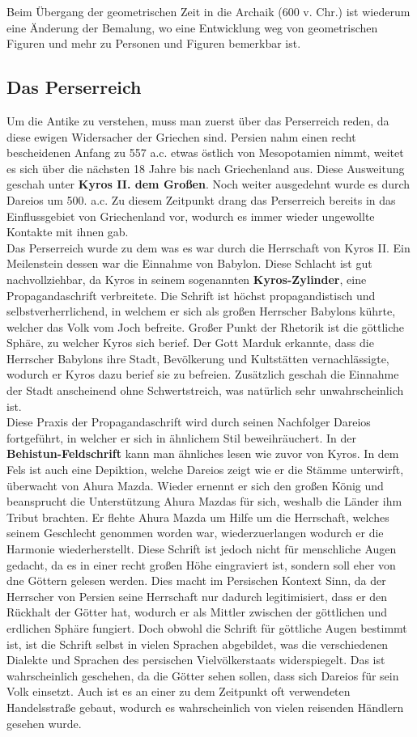 \documentclass{article}
\begin{document}
	Beim Übergang der geometrischen Zeit in die Archaik (600 v. Chr.) ist wiederum eine Änderung der Bemalung, wo eine Entwicklung weg von geometrischen Figuren und mehr zu Personen und Figuren bemerkbar ist.
	\subsection{Das Perserreich}
	Um die Antike zu verstehen, muss man zuerst über das Perserreich reden, da diese ewigen Widersacher der Griechen sind. Persien nahm einen recht bescheidenen Anfang zu 557 a.c. etwas östlich von Mesopotamien nimmt, weitet es sich über die nächsten 18 Jahre bis nach Griechenland aus. Diese Ausweitung geschah unter \textbf{Kyros II. dem Großen}. Noch weiter ausgedehnt wurde es durch Dareios um 500. a.c. Zu diesem Zeitpunkt drang das Perserreich bereits in das Einflussgebiet von Griechenland vor, wodurch es immer wieder ungewollte Kontakte mit ihnen gab. \\
	Das Perserreich wurde zu dem was es war durch die Herrschaft von Kyros II. Ein Meilenstein dessen war die Einnahme von Babylon. Diese Schlacht ist gut nachvollziehbar, da Kyros in seinem sogenannten \textbf{Kyros-Zylinder}, eine Propagandaschrift verbreitete. Die Schrift ist höchst propagandistisch und selbstverherrlichend, in welchem er sich als großen Herrscher Babylons kührte, welcher das Volk vom Joch befreite. Großer Punkt der Rhetorik ist die göttliche Sphäre, zu welcher Kyros sich berief. Der Gott Marduk erkannte, dass die Herrscher Babylons ihre Stadt, Bevölkerung und Kultstätten vernachlässigte, wodurch er Kyros dazu berief sie zu befreien. Zusätzlich geschah die Einnahme der Stadt anscheinend ohne Schwertstreich, was natürlich sehr unwahrscheinlich ist. \\
	Diese Praxis der Propagandaschrift wird durch seinen Nachfolger Dareios fortgeführt, in welcher er sich in ähnlichem Stil beweihräuchert. In der \textbf{Behistun-Feldschrift} kann man ähnliches lesen wie zuvor von Kyros. In dem Fels ist auch eine Depiktion, welche Dareios zeigt wie er die Stämme unterwirft, überwacht von Ahura Mazda. Wieder ernennt er sich den großen König und beansprucht die Unterstützung Ahura Mazdas für sich, weshalb die Länder ihm Tribut brachten. Er flehte Ahura Mazda um Hilfe um die Herrschaft, welches seinem Geschlecht genommen worden war, wiederzuerlangen wodurch er die Harmonie wiederherstellt. Diese Schrift ist jedoch nicht für menschliche Augen gedacht, da es in einer recht großen Höhe eingraviert ist, sondern soll eher von dne Göttern gelesen werden. Dies macht im Persischen Kontext Sinn, da der Herrscher von Persien seine Herrschaft nur dadurch legitimisiert, dass er den Rückhalt der Götter hat, wodurch er als Mittler zwischen der göttlichen und erdlichen Sphäre fungiert. Doch obwohl die Schrift für göttliche Augen bestimmt ist, ist die Schrift selbst in vielen Sprachen abgebildet, was die verschiedenen Dialekte und Sprachen des persischen Vielvölkerstaats widerspiegelt. Das ist wahrscheinlich geschehen, da die Götter sehen sollen, dass sich Dareios für sein Volk einsetzt. Auch ist es an einer zu dem Zeitpunkt oft verwendeten Handelsstraße gebaut, wodurch es wahrscheinlich von vielen reisenden Händlern gesehen wurde. \\
\end{document}
